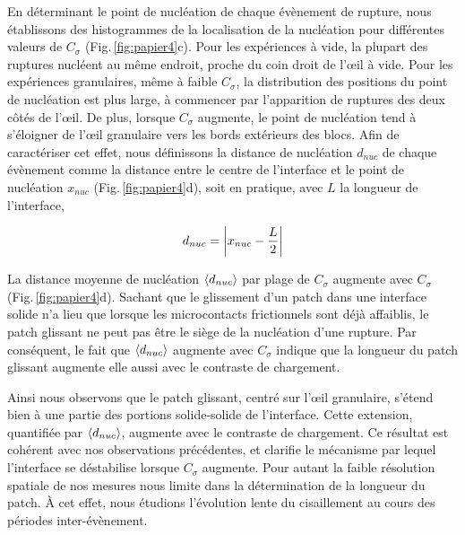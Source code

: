 En déterminant le point de nucléation de chaque évènement de rupture, nous établissons des histogrammes de la localisation de la nucléation pour différentes valeurs de $C_\sigma$ (Fig.\,\ref{fig:papier4}c). Pour les expériences à vide, la plupart des ruptures nucléent au même endroit, proche du coin droit de l'œil à vide. Pour les expériences granulaires, même à faible $C_\sigma$, la distribution des positions du point de nucléation est plus large, à commencer par l'apparition de ruptures des deux côtés de l'œil. De plus, lorsque $C_\sigma$ augmente, le point de nucléation tend à s'éloigner de l'œil granulaire vers les bords extérieurs des blocs. Afin de caractériser cet effet, nous définissons la distance de nucléation $d_{nuc}$ de chaque évènement comme la distance entre le centre de l'interface et le point de nucléation $x_{nuc}$ (Fig.\,\ref{fig:papier4}d), soit en pratique, avec $L$ la longueur de l'interface,

\begin{equation}
d_{nuc}=\left| x_{nuc}-\frac{L}{2} \right|
\end{equation}



La distance moyenne de nucléation $\left\langle {d_{nuc}} \right\rangle$ par plage de $C_\sigma$ augmente avec $C_\sigma$ (Fig.\,\ref{fig:papier4}d). Sachant que le glissement d'un patch dans une interface solide n'a lieu que lorsque les microcontacts frictionnels sont déjà affaiblis, le patch glissant ne peut pas être le siège de la nucléation d'une rupture. Par conséquent, le fait que $\left\langle {d_{nuc}} \right\rangle$ augmente avec $C_\sigma$ indique que la longueur du patch glissant augmente elle aussi avec le contraste de chargement.


Ainsi nous observons que le patch glissant, centré sur l'œil granulaire, s'étend bien à une partie des portions solide-solide de l'interface. Cette extension, quantifiée par $\left\langle {d_{nuc}} \right\rangle$, augmente avec le contraste de chargement. Ce résultat est cohérent avec nos observations précédentes, et clarifie le mécanisme par lequel l'interface se déstabilise lorsque $C_\sigma$ augmente. Pour autant la faible résolution spatiale de nos mesures nous limite dans la détermination de la longueur du patch. À cet effet, nous étudions l'évolution lente du cisaillement au cours des périodes inter-évènement.




